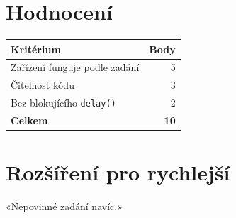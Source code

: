\documentclass[11pt,a4paper]{article}
\begin{document}
\section*{Hodnocení}

\begin{center}
\begin{tabular}{lr}
\toprule
Kritérium & Body \\
\midrule
Zařízení funguje podle zadání & 5 \\
Čitelnost kódu & 3 \\
Bez blokujícího \texttt{delay()} & 2 \\
\midrule
\textbf{Celkem} & \textbf{10} \\
\bottomrule
\end{tabular}
\end{center}

\section*{Rozšíření pro rychlejší}

«Nepovinné zadání navíc.»

\vfill
{}
\end{document}
